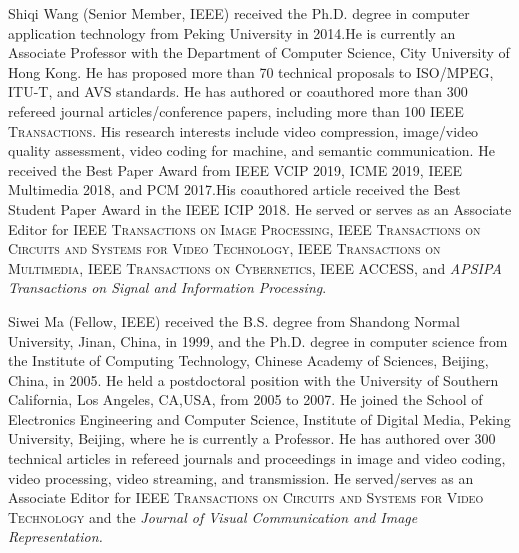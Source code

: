 \documentclass[lettersize,journal]{IEEEtran}
\begin{document}
\begin{IEEEbiography}
 {Shiqi Wang} (Senior Member, IEEE) received the Ph.D. degree in computer application technology from Peking University in 2014.He is currently an Associate Professor with the Department of Computer Science, City University of Hong Kong. He has proposed more than 70 technical proposals to ISO/MPEG, ITU-T, and AVS standards. He has authored or coauthored more than 300 refereed journal articles/conference papers, including more than 100 \textsc{IEEE Transactions}. His research interests include video compression, image/video quality assessment, video coding for machine, and semantic communication. He received the Best Paper Award from IEEE VCIP 2019, ICME 2019, IEEE Multimedia 2018, and PCM 2017.His coauthored article received the Best Student Paper Award in the IEEE ICIP 2018. He served or serves as an Associate Editor for \textsc{IEEE Transactions on Image Processing}, \textsc{IEEE Transactions on Circuits and Systems for Video Technology}, \textsc{IEEE Transactions on Multimedia}, \textsc{IEEE Transactions on Cybernetics}, \textsc{IEEE ACCESS}, and \textit{APSIPA Transactions on Signal and Information Processing}.
\end{IEEEbiography}

\begin{IEEEbiography}
{Siwei Ma} (Fellow, IEEE) received the B.S. degree from Shandong Normal University, Jinan, China, in 1999, and the Ph.D. degree in computer science from the Institute of Computing Technology, Chinese Academy of Sciences, Beijing, China, in 2005. He held a postdoctoral position with the University of Southern California, Los Angeles, CA,USA, from 2005 to 2007. He joined the School of Electronics Engineering and Computer Science, Institute of Digital Media, Peking University, Beijing, where he is currently a Professor. He has authored over 300 technical articles in refereed journals and proceedings in image and video coding, video processing, video streaming, and transmission. He served/serves as an Associate Editor for \textsc{IEEE Transactions on Circuits and Systems for Video Technology} and the \textit{Journal of Visual Communication and Image Representation.}
\end{IEEEbiography}
\end{document}
